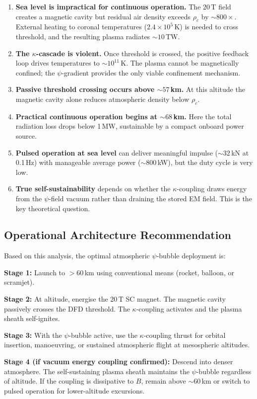 \documentclass[12pt,a4paper]{article}
\begin{document}
\begin{enumerate}
  \item \textbf{Sea level is impractical for continuous operation.}  The 20\,T field creates
        a magnetic cavity but residual air density exceeds $\rho_c$ by $\sim 800\times$.
        External heating to coronal temperatures ($2.4\times10^5$\,K) is needed to cross
        threshold, and the resulting plasma radiates $\sim 10$\,TW.

  \item \textbf{The $\kappa$-cascade is violent.}  Once threshold is crossed, the positive
        feedback loop drives temperatures to $\sim 10^{11}$\,K.  The plasma cannot be
        magnetically confined; the $\psi$-gradient provides the only viable confinement
        mechanism.

  \item \textbf{Passive threshold crossing occurs above $\sim 57$\,km.}  At this altitude
        the magnetic cavity alone reduces atmospheric density below $\rho_c$.

  \item \textbf{Practical continuous operation begins at $\sim 68$\,km.}  Here the total
        radiation loss drops below 1\,MW, sustainable by a compact onboard power source.

  \item \textbf{Pulsed operation at sea level} can deliver meaningful impulse ($\sim 32$\,kN
        at 0.1\,Hz) with manageable average power ($\sim 800$\,kW), but the duty cycle is
        very low.

  \item \textbf{True self-sustainability} depends on whether the $\kappa$-coupling draws
        energy from the $\psi$-field vacuum rather than draining the stored EM field.  This
        is the key theoretical question.
\end{enumerate}

\subsection{Operational Architecture Recommendation}

Based on this analysis, the optimal atmospheric $\psi$-bubble deployment is:

\textbf{Stage 1:} Launch to $>60$\,km using conventional means (rocket, balloon, or
scramjet).

\textbf{Stage 2:} At altitude, energise the 20\,T SC magnet.  The magnetic cavity
passively crosses the DFD threshold.  The $\kappa$-coupling activates and the plasma
sheath self-ignites.

\textbf{Stage 3:} With the $\psi$-bubble active, use the $\kappa$-coupling thrust for
orbital insertion, manoeuvring, or sustained atmospheric flight at mesospheric altitudes.

\textbf{Stage 4 (if vacuum energy coupling confirmed):} Descend into denser atmosphere.
The self-sustaining plasma sheath maintains the $\psi$-bubble regardless of altitude.
If the coupling is dissipative to $B$, remain above $\sim 60$\,km or switch to pulsed
operation for lower-altitude excursions.
\end{document}
